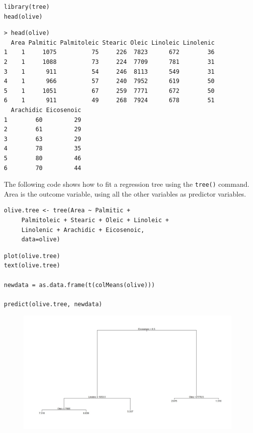 \documentclass[caret-main.tex]{subfiles}
\begin{document}
\newpage
\begin{framed}
\begin{verbatim}
library(tree)
head(olive)
\end{verbatim}
\end{framed}
\begin{verbatim}
> head(olive)
  Area Palmitic Palmitoleic Stearic Oleic Linoleic Linolenic
1    1     1075          75     226  7823      672        36
2    1     1088          73     224  7709      781        31
3    1      911          54     246  8113      549        31
4    1      966          57     240  7952      619        50
5    1     1051          67     259  7771      672        50
6    1      911          49     268  7924      678        51
  Arachidic Eicosenoic
1        60         29
2        61         29
3        63         29
4        78         35
5        80         46
6        70         44
\end{verbatim}
The following code shows how to fit a regression tree using the \texttt{tree()} command. Area is the outcome variable, using all the other variables as predictor variables.
\begin{framed}
\begin{verbatim}
olive.tree <- tree(Area ~ Palmitic + 
     Palmitoleic + Stearic + Oleic + Linoleic + 
     Linolenic + Arachidic + Eicosenoic, 
     data=olive)
\end{verbatim}
\end{framed}

\newpage
\begin{framed}
\begin{verbatim}
plot(olive.tree)
text(olive.tree)

newdata = as.data.frame(t(colMeans(olive)))

predict(olive.tree, newdata)

\end{verbatim}
\end{framed}
\begin{figure}
\centering
\includegraphics[width=0.95\linewidth]{./DAquiz6q4a}
\caption{}
\label{fig:DAquiz6q4a}
\end{figure}
\end{document}
